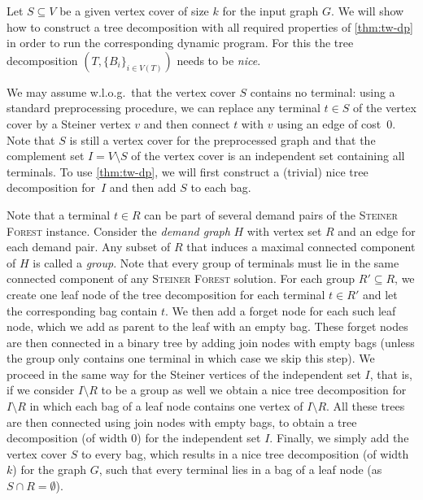\documentclass[a4paper]{article}
\theoremstyle{plain}
\newcommand{\pname}[1]{\textsc{#1}}
\newcommand{\SF}{\pname{Steiner Forest}\xspace}
\begin{document}
Let $S\subseteq V$ be a given vertex cover of size $k$ for the input graph $G$. We will show how to construct a tree decomposition with all required properties of \cref{thm:tw-dp} in order to run the corresponding dynamic program. For this the tree decomposition $(T,\{B_i\}_{i\in V(T)})$ needs to be \emph{nice}.

We may assume w.l.o.g.\ that the vertex cover $S$ contains no terminal: using a standard preprocessing procedure, we can replace any terminal $t\in S$ of the vertex cover by a Steiner vertex $v$ and then connect $t$ with $v$ using an edge of cost~$0$. 
Note that $S$ is still a vertex cover for the preprocessed graph and that the complement set $I=V\setminus S$
of the vertex cover is an independent set containing all terminals. To use \cref{thm:tw-dp},
we will first construct a (trivial) nice tree decomposition for~$I$ and then add $S$ to each bag.

Note that a terminal $t\in R$ can be part of several demand pairs of the \SF instance. 
Consider the \emph{demand graph} $H$ with vertex set $R$ and an edge for each demand pair.
Any subset of $R$ that induces a maximal connected component of $H$ is called a \emph{group}.
Note that every group of terminals must lie in the same connected component of any \SF solution.
For each group $R'\subseteq R$, we create one leaf node of the tree decomposition for each terminal $t\in R'$
and let the corresponding bag contain $t$. We then add a forget node for each such leaf node, which we add
as parent to the leaf with an empty bag. These forget nodes are then connected in a binary tree by adding
join nodes with empty bags (unless the group only contains one terminal in which case we skip this step). 
We proceed in the same way for the Steiner vertices of the independent set $I$,
that is, if we consider $I\setminus R$ to be a group as well we obtain a nice tree decomposition for $I\setminus R$
in which each bag of a leaf node contains one vertex of $I\setminus R$. 
All these trees are then connected using join nodes with empty bags, to obtain a tree decomposition
(of width $0$) for the independent set $I$. Finally, we simply add the vertex cover $S$ to every bag,
which results in a nice tree decomposition (of width $k$) for the graph $G$, such that
every terminal lies in a bag of a leaf node (as~$S\cap R=\emptyset$).
\end{document}
